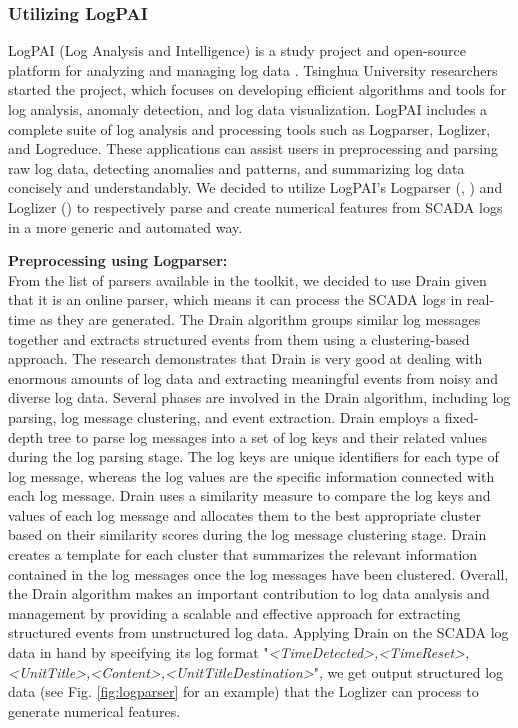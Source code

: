   \subsubsection{Utilizing LogPAI}
    LogPAI (Log Analysis and Intelligence) is a study project and open-source platform for analyzing and managing log data \cite{LogPAI}. 
    Tsinghua University researchers started the project, which focuses on developing efficient algorithms and tools for log analysis, anomaly detection, and log data visualization.
    LogPAI includes a complete suite of log analysis and processing tools such as Logparser, Loglizer, and Logreduce. 
    These applications can assist users in preprocessing and parsing raw log data, detecting anomalies and patterns, and summarizing log data concisely and understandably.
    We decided to utilize LogPAI's Logparser (\cite{Logparser_1}, \cite{Logparser_2}) and Loglizer (\cite{Loglizer}) to respectively parse and create numerical features from 
    SCADA logs in a more generic and automated way.\\

    \begin{flushleft}
      \textbf{Preprocessing using Logparser:}\\
      From the list of parsers available in the toolkit, we decided to use Drain \cite{Drain} given that it is an online parser, which means it can process the SCADA logs 
      in real-time as they are generated. The Drain algorithm groups similar log messages together and extracts structured events from them using a 
      clustering-based approach. The research demonstrates that Drain is very good at dealing with enormous amounts of log data and extracting meaningful events from 
      noisy and diverse log data. Several phases are involved in the Drain algorithm, including log parsing, log message clustering, and event extraction. 
      Drain employs a fixed-depth tree to parse log messages into a set of log keys and their related values during the log parsing stage. The log keys 
      are unique identifiers for each type of log message, whereas the log values are the specific information connected with each log message. Drain uses a similarity measure 
      to compare the log keys and values of each log message and allocates them to the best appropriate cluster based on their similarity scores during the log message 
      clustering stage. Drain creates a template for each cluster that summarizes the relevant information contained in the log messages once the log messages have been clustered.
      Overall, the Drain algorithm makes an important contribution to log data analysis and management by providing a scalable and effective approach for extracting structured 
      events from unstructured log data.
      Applying Drain on the SCADA log data in hand by specifying its log format "\emph{<TimeDetected>,<TimeReset>,<UnitTitle>,<Content>,<UnitTitleDestination>}", we get 
      output structured log data (see Fig. \ref{fig:logparser} for an example) that the Loglizer can process to generate numerical features.
    \end{flushleft}

